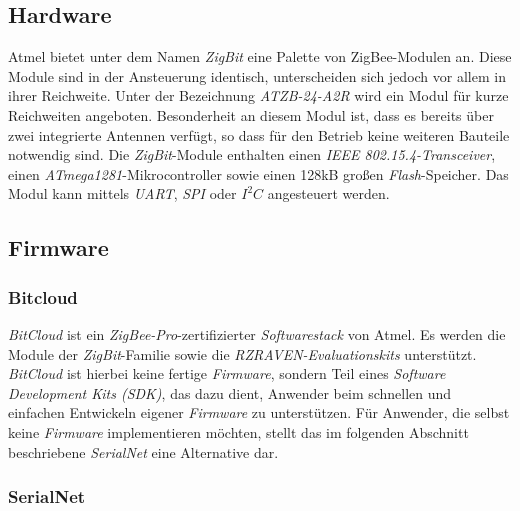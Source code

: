     \subsection{Hardware}

        Atmel bietet unter dem Namen \emph{ZigBit} eine Palette von ZigBee-Modulen an. Diese Module sind in der
        Ansteuerung identisch, unterscheiden sich jedoch vor allem in ihrer Reichweite. Unter der Bezeichnung 
        \emph{ATZB-24-A2R} wird ein Modul für kurze Reichweiten angeboten. Besonderheit an diesem Modul ist, 
        dass es bereits über zwei integrierte Antennen verfügt, so dass für den Betrieb keine weiteren Bauteile
        notwendig sind.
        Die \emph{ZigBit}-Module enthalten einen \emph{IEEE 802.15.4-Transceiver}, einen 
        \emph{ATmega1281}-Mikrocontroller sowie einen
        128kB großen \emph{Flash}-Speicher. Das Modul kann mittels \emph{UART}, \emph{SPI} oder \emph{$I^2C$} angesteuert 
        werden. \cite{zigbit_datasheet}

    \subsection{Firmware}
        \subsubsection{Bitcloud}
            \emph{BitCloud}  ist ein \emph{ZigBee-Pro}-zertifizierter \emph{Softwarestack} von Atmel. Es werden die 
            Module der \emph{ZigBit}-Familie
            sowie die \emph{RZRAVEN-Evaluationskits} unterstützt. \emph{BitCloud} ist hierbei keine fertige
            \emph{Firmware}, sondern 
            Teil eines \emph{Software Development Kits (SDK)}, das dazu dient, Anwender beim schnellen und einfachen Entwickeln eigener 
            \emph{Firmware} zu unterstützen. Für Anwender, die selbst keine \emph{Firmware} implementieren möchten, 
            stellt das im folgenden Abschnitt beschriebene \emph{SerialNet} eine Alternative dar.

        \subsubsection{SerialNet}

